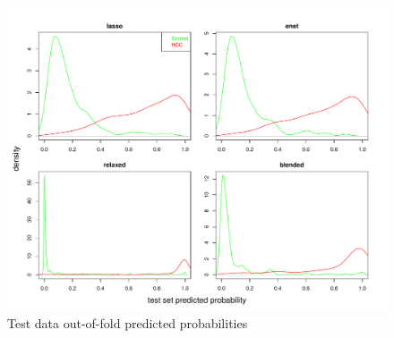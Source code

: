 \documentclass[
]{book}
\begin{document}
\begin{figure}
\centering
\includegraphics{Static/figures/hcc5hmC-glmnetFit-testOOFprobs-1.pdf}
\caption{\label{fig:hcc5hmC-glmnetFit-testOOFprobs}Test data out-of-fold predicted probabilities}
\end{figure}
\end{document}
